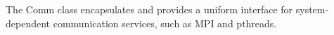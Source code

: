 
The Comm class encapsulates and provides a uniform interface for
system-dependent communication services, such as MPI and pthreads.
